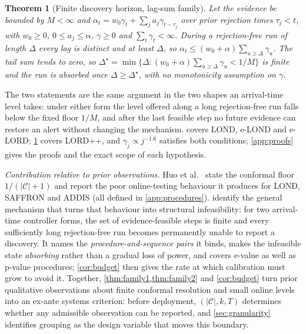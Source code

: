 \documentclass[conference]{IEEEtran}
\newtheorem{theorem}{Theorem}
\newcommand{\Cal}{\mathcal{C}}
\newcommand{\nCal}{\lvert\Cal\rvert}
\newcommand{\ceil}{M}
\newcommand{\alphat}{\alpha_t}
\begin{document}
\begin{theorem}[Finite discovery horizon, lag-sum family]\label{thm:family2}
Let the evidence be bounded by $\ceil<\infty$ and
$\alphat=w_0\gamma_t+\sum_j a_j\gamma_{t-\tau_j}$ over prior rejection times $\tau_j<t$, with
$w_0\ge0$, $0\le a_j\le\alpha$, $\gamma\ge0$ and $\sum_t\gamma_t<\infty$. During a rejection-free run of length $\Delta$ every lag
is distinct and at least $\Delta$, so $\alphat\le(w_0+\alpha)\sum_{u\ge\Delta}\gamma_u$. The tail sum
tends to zero, so $\Delta^{\star}=\min\{\Delta:(w_0+\alpha)\sum_{u\ge\Delta}\gamma_u<1/\ceil\}$ is finite
and the run is absorbed once $\Delta\ge\Delta^{\star}$, with no monotonicity assumption on $\gamma$.
\end{theorem}

The two statements are the same argument in the two shapes an arrival-time level takes: under either
form the level offered along a long rejection-free run falls below the fixed floor $1/\ceil$, and after
the last feasible step no future evidence can restore an alert without changing the mechanism.  covers LOND, e-LOND and e-LORD;
\cref{thm:family2} covers LORD++, and $\gamma_j\propto j^{-1.6}$ satisfies both conditions; \cref{app:proofs} gives the proofs and the exact scope of each hypothesis.

\emph{Contribution relative to prior observations.} Huo et al.~\cite{huo2024realtime} state the
conformal floor $1/(\nCal+1)$ and report the poor online-testing behaviour it produces for LOND,
SAFFRON and ADDIS (all defined in \cref{app:procedures}).  identify the general mechanism that turns that
behaviour into structural infeasibility: for two arrival-time controller forms, the set of
evidence-feasible steps is finite and every sufficiently long rejection-free run becomes permanently
unable to report a discovery. It names the \emph{procedure-and-sequence pairs} it binds, makes the
infeasible state \emph{absorbing} rather than a gradual loss of power, and covers e-value as well as
p-value procedures; \cref{cor:budget} then gives the rate at which calibration must grow to avoid it. Together, \cref{thm:family1,thm:family2} and \cref{cor:budget}
turn prior qualitative observations about finite conformal resolution and small online levels into an
ex-ante systems criterion: before deployment, $(\nCal,k,T)$ determines whether any admissible
observation can be reported, and \cref{sec:granularity} identifies grouping as the design variable
that moves this boundary.
\end{document}

